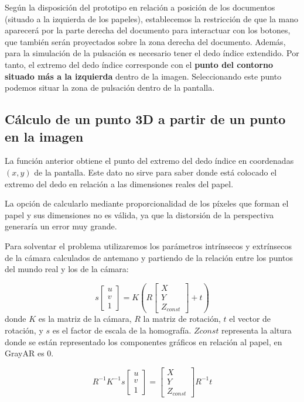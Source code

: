 Según la disposición del prototipo en relación a posición de los
documentos (situado a la izquierda de los papeles), establecemos la restricción de que la mano aparecerá por
la parte derecha del documento para interactuar con los botones, que
también serán proyectados sobre la zona derecha del documento. Además,
para la simulación de la pulsación es necesario tener el dedo índice
extendido. Por tanto, el extremo del dedo índice corresponde con el
 \textbf{punto del contorno situado más a la izquierda} dentro de la
imagen. Seleccionando este punto podemos situar la zona de pulsación
dentro de la pantalla.

\subsection{Cálculo de un punto 3D a partir de un punto en la imagen}
La función anterior obtiene el punto del extremo del dedo índice en
coordenadas $(x,y)$ de la pantalla. Este dato no sirve para saber
donde está colocado el extremo del dedo en relación a las
dimensiones reales del papel.

La opción de calcularlo mediante proporcionalidad de los píxeles que
forman el papel y sus dimensiones no es válida, ya que la distorsión
de la perspectiva generaría un error muy grande.

Para solventar el problema utilizaremos los parámetros intrínsecos y
extrínsecos de la cámara calculados de antemano y partiendo de la
relación entre los puntos del mundo real y los de la cámara:

\begin{equation}
s \begin{bmatrix}
u\\
v\\
1
\end{bmatrix} = K(R\begin{bmatrix}
X\\
Y\\
Z_{const}
\end{bmatrix}+t)
\end{equation}
donde $K$ es la matriz de la cámara, $R$ la matriz de rotación, $t$ el
vector de rotación, y $s$ es el factor de escala de la homografía. $Zconst$ representa la altura
donde se están representado los componentes gráficos en relación al papel, en GrayAR es 0.

\begin{equation}
R^{-1} K^{-1} s \begin{bmatrix}
u\\
v\\
1
\end{bmatrix} = \begin{bmatrix}
X\\
Y\\
Z_{const}
\end{bmatrix} R^{-1}t
\end{equation}

